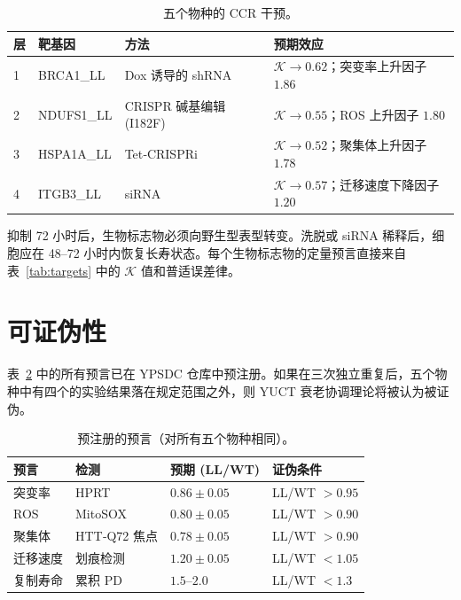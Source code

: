\documentclass[12pt,a4paper]{article}
\newcommand{\REL}{\mathcal{K}}          %
\begin{document}
	\begin{table}[H]
		\centering
		\caption{五个物种的 CCR 干预。}
		\label{tab:CCR}
		\begin{tabular}{@{}llll@{}}
			\toprule
			\textbf{层} & \textbf{靶基因} & \textbf{方法} & \textbf{预期效应} \\
			\midrule
			1 & BRCA1\_LL & Dox 诱导的 shRNA & \(\REL \to 0.62\)；突变率上升因子 \(1.86\) \\
			2 & NDUFS1\_LL & CRISPR 碱基编辑 (I182F) & \(\REL \to 0.55\)；ROS 上升因子 \(1.80\) \\
			3 & HSPA1A\_LL & Tet‑CRISPRi & \(\REL \to 0.52\)；聚集体上升因子 \(1.78\) \\
			4 & ITGB3\_LL & siRNA & \(\REL \to 0.57\)；迁移速度下降因子 \(1.20\) \\
			\bottomrule
		\end{tabular}
	\end{table}
	
	抑制 72 小时后，生物标志物必须向野生型表型转变。洗脱或 siRNA 稀释后，细胞应在 48–72 小时内恢复长寿状态。每个生物标志物的定量预言直接来自表~\ref{tab:targets} 中的 \(\REL\) 值和普适误差律。
	
	\section{可证伪性}
	\label{sec:falsifiability}
	表~\ref{tab:predictions} 中的所有预言已在 YPSDC 仓库中预注册。如果在三次独立重复后，五个物种中有四个的实验结果落在规定范围之外，则 YUCT 衰老协调理论将被认为被证伪。
	
	\begin{table}[H]
		\centering
		\caption{预注册的预言（对所有五个物种相同）。}
		\label{tab:predictions}
		\begin{tabular}{@{}llll@{}}
			\toprule
			\textbf{预言} & \textbf{检测} & \textbf{预期 (LL/WT)} & \textbf{证伪条件} \\
			\midrule
			突变率       & HPRT           & \(0.86 \pm 0.05\) & LL/WT \(> 0.95\) \\
			ROS                 & MitoSOX        & \(0.80 \pm 0.05\) & LL/WT \(> 0.90\) \\
			聚集体          & HTT‑Q72 焦点   & \(0.78 \pm 0.05\) & LL/WT \(> 0.90\) \\
			迁移速度     & 划痕检测  & \(1.20 \pm 0.05\) & LL/WT \(< 1.05\) \\
			复制寿命 & 累积 PD  & \(1.5\)–\(2.0\)   & LL/WT \(< 1.3\) \\
			\bottomrule
		\end{tabular}
	\end{table}
	
\end{document}
